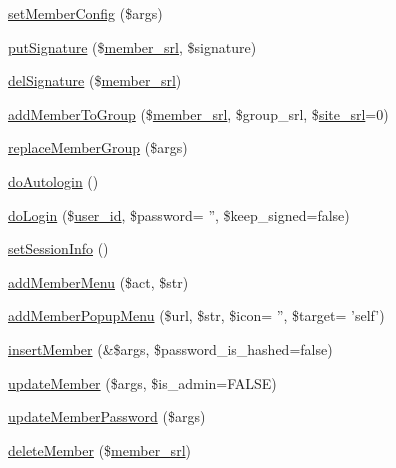 \begin{DoxyCompactItemize}
\item 
\hyperlink{classmemberController_a842fafd2abf22d779591486124003d92}{set\+Member\+Config} (\$args)
\item 
\hyperlink{classmemberController_a084c3af4daea1a860f95e06f2bc5fc28}{put\+Signature} (\$\hyperlink{ko_8install_8php_aa61f9e08f0fe505094d26f8143f30bbd}{member\+\_\+srl}, \$signature)
\item 
\hyperlink{classmemberController_a0fa2ec662eb7a40333ca2049a103385e}{del\+Signature} (\$\hyperlink{ko_8install_8php_aa61f9e08f0fe505094d26f8143f30bbd}{member\+\_\+srl})
\item 
\hyperlink{classmemberController_aca7533f0e95df7227073436c24827c7b}{add\+Member\+To\+Group} (\$\hyperlink{ko_8install_8php_aa61f9e08f0fe505094d26f8143f30bbd}{member\+\_\+srl}, \$group\+\_\+srl, \$\hyperlink{ko_8install_8php_a8b1406b4ad1048041558dce6bfe89004}{site\+\_\+srl}=0)
\item 
\hyperlink{classmemberController_acc92443cdd02e55cec12099722482737}{replace\+Member\+Group} (\$args)
\item 
\hyperlink{classmemberController_aeb2590d01346c9a25c2b22f99429f6a3}{do\+Autologin} ()
\item 
\hyperlink{classmemberController_a92930ff9a5763ef9d6d292c7154269e4}{do\+Login} (\$\hyperlink{ko_8install_8php_a74f1a394389d774e5b4cd5d1d15413f7}{user\+\_\+id}, \$password= '', \$keep\+\_\+signed=false)
\item 
\hyperlink{classmemberController_ae4175b4a60e0b3000ed12e36508720ad}{set\+Session\+Info} ()
\item 
\hyperlink{classmemberController_aaa52725f8ba9ba16cfe4b350a51d7420}{add\+Member\+Menu} (\$act, \$str)
\item 
\hyperlink{classmemberController_a91303fbd27713d1990f88b8dd3c09b2b}{add\+Member\+Popup\+Menu} (\$url, \$str, \$icon= '', \$target= 'self')
\item 
\hyperlink{classmemberController_ae588324b8e86b9259e40d104b4d2b42d}{insert\+Member} (\&\$args, \$password\+\_\+is\+\_\+hashed=false)
\item 
\hyperlink{classmemberController_ac1ad3397eda0a695046b023a14d25496}{update\+Member} (\$args, \$is\+\_\+admin=F\+A\+L\+S\+E)
\item 
\hyperlink{classmemberController_aed05d2a367f7e7a5b70fcbd0b4a08e74}{update\+Member\+Password} (\$args)
\item 
\hyperlink{classmemberController_a5170b3fafc449f4cc6fc599c093fcc06}{delete\+Member} (\$\hyperlink{ko_8install_8php_aa61f9e08f0fe505094d26f8143f30bbd}{member\+\_\+srl})

\end{DoxyCompactItemize}
